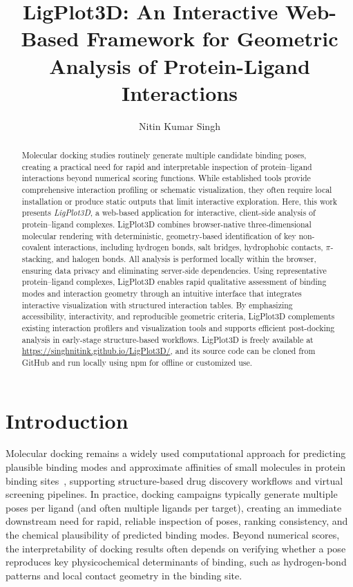 \documentclass[journal=jacsat,manuscript=article]{achemso}
\author{Nitin Kumar Singh}
\affiliation[Indian Institute of Technology (IIT) Gandhinagar]
{Discipline of Chemical Engineering, Indian Institute of Technology (IIT) Gandhinagar, Palaj, Gujarat 382355, India}
\title[LigPlot3D]
  {LigPlot3D: An Interactive Web-Based Framework for Geometric Analysis of Protein-Ligand Interactions}
\begin{document}
\begin{abstract}
Molecular docking studies routinely generate multiple candidate binding poses, creating a practical need for rapid and interpretable inspection of protein--ligand interactions beyond numerical scoring functions. While established tools provide comprehensive interaction profiling or schematic visualization, they often require local installation or produce static outputs that limit interactive exploration. Here, this work presents \textit{LigPlot3D}, a web-based application for interactive, client-side analysis of protein--ligand complexes. LigPlot3D combines browser-native three-dimensional molecular rendering with deterministic, geometry-based identification of key non-covalent interactions, including hydrogen bonds, salt bridges, hydrophobic contacts, $\pi$-stacking, and halogen bonds. All analysis is performed locally within the browser, ensuring data privacy and eliminating server-side dependencies. Using representative protein--ligand complexes, LigPlot3D enables rapid qualitative assessment of binding modes and interaction geometry through an intuitive interface that integrates interactive visualization with structured interaction tables. By emphasizing accessibility, interactivity, and reproducible geometric criteria, LigPlot3D complements existing interaction profilers and visualization tools and supports efficient post-docking analysis in early-stage structure-based workflows. LigPlot3D is freely available at \url{https://singhnitink.github.io/LigPlot3D/}, and its source code can be cloned from GitHub and run locally using npm for offline or customized use.
\end{abstract}


\section{Introduction}
Molecular docking remains a widely used computational approach for predicting plausible binding modes and approximate affinities of small molecules in protein binding sites~\cite{paggi2024art}, supporting structure-based drug discovery workflows and virtual screening pipelines. In practice, docking campaigns typically generate multiple poses per ligand (and often multiple ligands per target), creating an immediate downstream need for rapid, reliable inspection of poses, ranking consistency, and the chemical plausibility of predicted binding modes. Beyond numerical scores, the interpretability of docking results often depends on verifying whether a pose reproduces key physicochemical determinants of binding, such as hydrogen-bond patterns and local contact geometry in the binding site.
\end{document}

